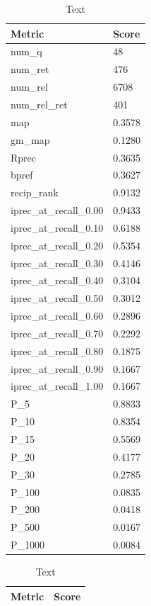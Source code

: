 \begin{table}[htb]
    \parbox{.45\linewidth}{
    \begin{tabular}{ | l | l | }
    \hline
    Metric & Score \\ \hline
	num\_q & 48 \\ \hline
	num\_ret & 476 \\ \hline
	num\_rel & 6708 \\ \hline
	num\_rel\_ret & 401 \\ \hline
	map & 0.3578 \\ \hline
	gm\_map & 0.1280 \\ \hline
	Rprec & 0.3635 \\ \hline
	bpref & 0.3627 \\ \hline
	recip\_rank & 0.9132 \\ \hline
	iprec\_at\_recall\_0.00 & 0.9433 \\ \hline
	iprec\_at\_recall\_0.10 & 0.6188 \\ \hline
	iprec\_at\_recall\_0.20 & 0.5354 \\ \hline
	iprec\_at\_recall\_0.30 & 0.4146 \\ \hline
	iprec\_at\_recall\_0.40 & 0.3104 \\ \hline
	iprec\_at\_recall\_0.50 & 0.3012 \\ \hline
	iprec\_at\_recall\_0.60 & 0.2896 \\ \hline
	iprec\_at\_recall\_0.70 & 0.2292 \\ \hline
	iprec\_at\_recall\_0.80 & 0.1875 \\ \hline
	iprec\_at\_recall\_0.90 & 0.1667 \\ \hline
	iprec\_at\_recall\_1.00 & 0.1667 \\ \hline
	P\_5 & 0.8833 \\ \hline
	P\_10 & 0.8354 \\ \hline
	P\_15 & 0.5569 \\ \hline
	P\_20 & 0.4177 \\ \hline
	P\_30 & 0.2785 \\ \hline
	P\_100 & 0.0835 \\ \hline
	P\_200 & 0.0418 \\ \hline
	P\_500 & 0.0167 \\ \hline
	P\_1000 & 0.0084 \\ \hline
    \end{tabular}
    \caption{Text}    
    }
    \hfill
    \parbox{.45\linewidth}{
    \begin{tabular}{ | l | l | }
    \hline
    Metric & Score \\ \hline

\end{tabular}}
\end{table}
